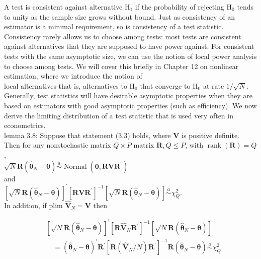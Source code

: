 \documentclass[10pt]{article}
\begin{document}
A test is consistent against alternative $\mathrm{H}_{1}$ if the probability of rejecting $\mathrm{H}_{0}$ tends to unity as the sample size grows without bound. Just as consistency of an estimator is a minimal requirement, so is consistency of a test statistic. Consistency rarely allows us to choose among tests: most tests are consistent against alternatives that they are supposed to have power against. For consistent tests with the same asymptotic size, we can use the notion of local power analysis to choose among tests. We will cover this briefly in Chapter 12 on nonlinear estimation, where we introduce the notion of\\
local alternatives-that is, alternatives to $\mathrm{H}_{0}$ that converge to $\mathrm{H}_{0}$ at rate $1 / \sqrt{N}$. Generally, test statistics will have desirable asymptotic properties when they are based on estimators with good asymptotic properties (such as efficiency). We now derive the limiting distribution of a test statistic that is used very often in econometrics.\\
lemma 3.8: Suppose that statement (3.3) holds, where $\mathbf{V}$ is positive definite. Then for any nonstochastic matrix $Q \times P$ matrix $\mathbf{R}, Q \leq P$, with $\operatorname{rank}(\mathbf{R})=Q$,\\
$\sqrt{N} \mathbf{R}\left(\hat{\boldsymbol{\theta}}_{N}-\boldsymbol{\theta}\right) \stackrel{a}{\sim} \operatorname{Normal}\left(\mathbf{0}, \mathbf{R V R}^{\prime}\right)$\\
and\\
$\left[\sqrt{N} \mathbf{R}\left(\hat{\boldsymbol{\theta}}_{N}-\boldsymbol{\theta}\right)\right]^{\prime}\left[\mathbf{R} \mathbf{V} \mathbf{R}^{\prime}\right]^{-1}\left[\sqrt{N} \mathbf{R}\left(\hat{\boldsymbol{\theta}}_{N}-\boldsymbol{\theta}\right)\right] \stackrel{a}{\sim} \chi_{Q}^{2}$.\\
In addition, if plim $\hat{\mathbf{V}}_{N}=\mathbf{V}$ then

$$
\begin{aligned}
& {\left[\sqrt{N} \mathbf{R}\left(\hat{\boldsymbol{\theta}}_{N}-\boldsymbol{\theta}\right)\right]^{\prime}\left[\mathbf{R} \hat{\mathbf{V}}_{N} \mathbf{R}^{\prime}\right]^{-1}\left[\sqrt{N} \mathbf{R}\left(\hat{\boldsymbol{\theta}}_{N}-\boldsymbol{\theta}\right)\right]} \\
& \quad=\left(\hat{\boldsymbol{\theta}}_{N}-\boldsymbol{\theta}\right)^{\prime} \mathbf{R}^{\prime}\left[\mathbf{R}\left(\hat{\mathbf{V}}_{N} / N\right) \mathbf{R}^{\prime}\right]^{-1} \mathbf{R}\left(\hat{\boldsymbol{\theta}}_{N}-\boldsymbol{\theta}\right) \stackrel{a}{\sim} \chi_{Q}^{2}
\end{aligned}
$$
\end{document}
